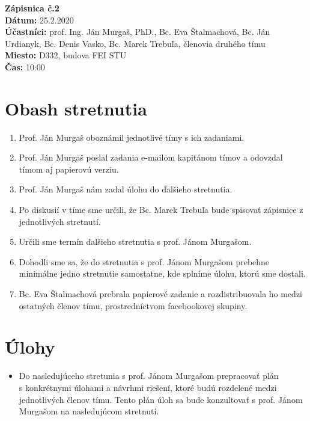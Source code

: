 
\usepackage{parskip}%

	\textbf{{\Huge Zápisnica č.2}}\\
			
	\textbf{Dátum:} 25.2.2020\\	
		
	\textbf{Účastníci:} prof. Ing. Ján Murgaš, PhD., Bc. Eva Štalmachová, Bc. Ján Urdianyk, Bc. Denis Vasko, Bc. Marek Trebuľa, členovia druhého tímu\\
		
	\textbf{Miesto:} D332, budova FEI STU\\	
	
	\textbf{Čas:} 10:00    
    \section*{Obash stretnutia}
    \begin{enumerate}
    	\item Prof. Ján Murgaš oboznámil jednotlivé tímy s ich zadaniami.
    	\item Prof. Ján Murgaš poslal zadania e-mailom kapitánom tímov a odovzdal\\ tímom aj papierovú verziu.
    	\item Prof. Ján Murgaš nám zadal úlohu do ďalšieho stretnutia.
    	\item Po diskusií v tíme sme určili, že Bc. Marek Trebuľa bude spisovať zápisnice z jednotlivých stretnutí.
    	\item Určili sme termín ďalšieho stretnutia s prof. Jánom Murgašom.
    	\item Dohodli sme sa, že do stretnutia s prof. Jánom Murgašom prebehne\\ minimálne jedno stretnutie samostatne, kde splníme úlohu, ktorú sme dostali.
    	\item Bc. Eva Štalmachová prebrala papierové zadanie a rozdistribuovala ho medzi ostatných členov tímu, prostredníctvom facebookovej skupiny.
    	
    \end{enumerate}    
    \section*{Úlohy}
    \begin{itemize}
    	\item Do nasledujúceho stretunia s prof. Jánom Murgašom prepracovať plán\\ s konkrétnymi úlohami a návrhmi riešení, ktoré budú rozdelené medzi\\ jednotlivých členov tímu. Tento plán úloh sa bude konzultovať s prof. Jánom Murgašom na nasledujúcom stretnutí.
    \end{itemize}

